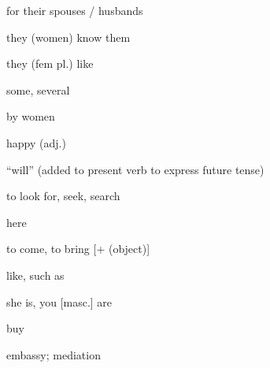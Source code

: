 \documentclass[avery5371,grid,frame]{flashcards}
\begin{document}
\begin{flashcard}{\LARGE for their spouses / husbands}
\LARGE {}
\end{flashcard}
\begin{flashcard}{\LARGE they (women) know them}
\LARGE {}
\end{flashcard}
\begin{flashcard}{\LARGE they (fem pl.) like}
\LARGE {}
\end{flashcard}
\begin{flashcard}{\LARGE some, several}
\LARGE {}
\end{flashcard}
\begin{flashcard}{\LARGE by women}
\LARGE {}
\end{flashcard}
\begin{flashcard}{\LARGE happy (adj.)}
\LARGE {}
\end{flashcard}
\begin{flashcard}{\LARGE ``will'' (added to present verb to express future tense)}
\LARGE {}
\end{flashcard}
\begin{flashcard}{\LARGE to look for, seek, search}
\LARGE {}
\end{flashcard}
\begin{flashcard}{\LARGE here}
\LARGE {}
\end{flashcard}
\begin{flashcard}{\LARGE to come, to bring {[}+  (object){]}}
\LARGE {}
\end{flashcard}
\begin{flashcard}{\LARGE like, such as}
\LARGE {}
\end{flashcard}
\begin{flashcard}{\LARGE she is, you {[}masc.{]} are}
\LARGE {}
\end{flashcard}
\begin{flashcard}{\LARGE buy}
\LARGE {}
\end{flashcard}
\begin{flashcard}{\LARGE embassy; mediation}
\LARGE {}
\end{flashcard}
\end{document}
